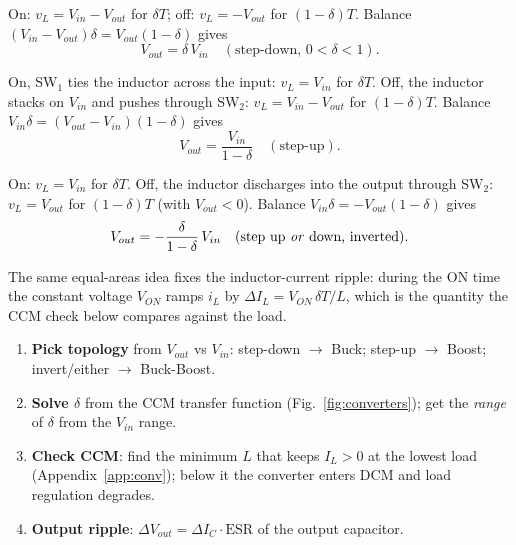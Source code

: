 \documentclass[11pt,a4paper,oneside]{book}
\begin{document}
\begin{description}[leftmargin=2.0cm,style=nextline]
  \item[Buck] On: $v_L=V_{in}-V_{out}$ for $\delta T$; off: $v_L=-V_{out}$ for
        $(1-\delta)T$. Balance $(V_{in}-V_{out})\delta=V_{out}(1-\delta)$ gives
        \[ V_{out}=\delta\,V_{in}\quad(\text{step-down, }0<\delta<1). \]
  \item[Boost] On, SW$_1$ ties the inductor across the input: $v_L=V_{in}$ for
        $\delta T$. Off, the inductor stacks on $V_{in}$ and pushes through SW$_2$:
        $v_L=V_{in}-V_{out}$ for $(1-\delta)T$. Balance
        $V_{in}\delta=(V_{out}-V_{in})(1-\delta)$ gives
        \[ V_{out}=\frac{V_{in}}{1-\delta}\quad(\text{step-up}). \]
  \item[Buck--Boost] On: $v_L=V_{in}$ for $\delta T$. Off, the inductor discharges into
        the output through SW$_2$: $v_L=V_{out}$ for $(1-\delta)T$ (with $V_{out}<0$).
        Balance $V_{in}\delta=-V_{out}(1-\delta)$ gives
        \[ V_{out}=-\frac{\delta}{1-\delta}\,V_{in}\quad(\text{step up \emph{or} down, inverted}). \]
\end{description}

\noindent The same equal-areas idea fixes the inductor-current ripple: during the ON
time the constant voltage $V_{ON}$ ramps $i_L$ by $\Delta I_L = V_{ON}\,\delta T/L$, which
is the quantity the CCM check below compares against the load.

\begin{protocol}
\begin{enumerate}[leftmargin=1.5cm]
  \item \textbf{Pick topology} from $V_{out}$ vs $V_{in}$: step-down $\to$ Buck;
        step-up $\to$ Boost; invert/either $\to$ Buck-Boost.
  \item \textbf{Solve $\delta$} from the CCM transfer function
        (Fig.~\ref{fig:converters}); get the \emph{range} of $\delta$ from the
        $V_{in}$ range.
  \item \textbf{Check CCM}: find the minimum $L$ that keeps $I_L>0$ at the lowest
        load (Appendix~\ref{app:conv}); below it the converter enters DCM and
        load regulation degrades.
  \item \textbf{Output ripple}: $\Delta V_{out}=\Delta I_C\cdot\text{ESR}$ of the
        output capacitor.
\end{enumerate}
\end{protocol}
\end{document}
